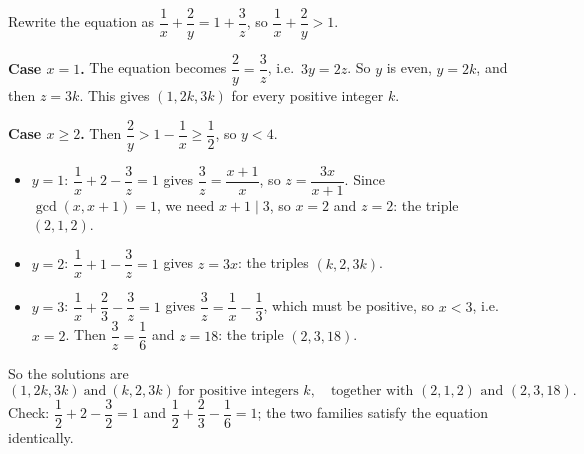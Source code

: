 Rewrite the equation as $\dfrac{1}{x}+\dfrac{2}{y}=1+\dfrac{3}{z}$, so $\dfrac{1}{x}+\dfrac{2}{y}>1$.

\textbf{Case $x=1$.} The equation becomes $\dfrac{2}{y}=\dfrac{3}{z}$, i.e.\ $3y=2z$. So $y$ is even, $y=2k$, and then $z=3k$. This gives $(1,2k,3k)$ for every positive integer $k$.

\textbf{Case $x\ge2$.} Then $\dfrac{2}{y}>1-\dfrac{1}{x}\ge\dfrac{1}{2}$, so $y<4$.
\begin{itemize}
\item $y=1$: $\dfrac{1}{x}+2-\dfrac{3}{z}=1$ gives $\dfrac{3}{z}=\dfrac{x+1}{x}$, so $z=\dfrac{3x}{x+1}$. Since $\gcd(x,x+1)=1$, we need $x+1\mid3$, so $x=2$ and $z=2$: the triple $(2,1,2)$.
\item $y=2$: $\dfrac{1}{x}+1-\dfrac{3}{z}=1$ gives $z=3x$: the triples $(k,2,3k)$.
\item $y=3$: $\dfrac{1}{x}+\dfrac{2}{3}-\dfrac{3}{z}=1$ gives $\dfrac{3}{z}=\dfrac{1}{x}-\dfrac{1}{3}$, which must be positive, so $x<3$, i.e.\ $x=2$. Then $\dfrac{3}{z}=\dfrac{1}{6}$ and $z=18$: the triple $(2,3,18)$.
\end{itemize}

So the solutions are
\[
\boxed{(1,2k,3k)\ \text{and}\ (k,2,3k)\ \text{for positive integers }k,\quad\text{together with }(2,1,2)\text{ and }(2,3,18).}
\]
Check: $\dfrac{1}{2}+2-\dfrac{3}{2}=1$ and $\dfrac{1}{2}+\dfrac{2}{3}-\dfrac{1}{6}=1$; the two families satisfy the equation identically.
